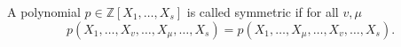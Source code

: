 A polynomial $p \in \mathbb{Z}[X_1, \ldots, X_s]$ is called symmetric if for all $v, \mu$
$$p(X_1, \ldots, X_v, \ldots, X_\mu, \ldots, X_s) = p(X_1, \ldots, X_\mu, \ldots, X_v, \ldots, X_s).$$
